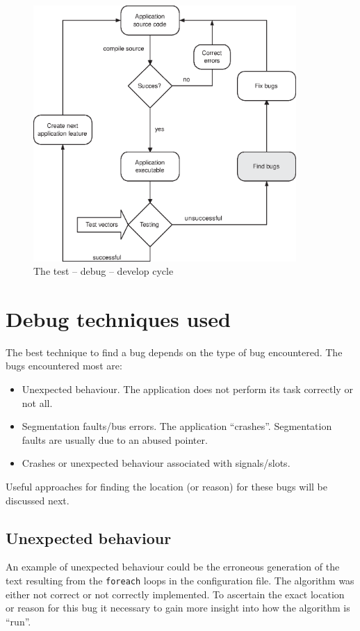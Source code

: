 \begin{figure} \begin{center}
\includegraphics[width=10cm]{./figures/testcycle.eps}
\caption{The test -- debug -- develop cycle}
\label{fig:testing:cycle}
\end{center} \end{figure}

\section{Debug techniques used} \label{chap:testing:techniques}
The best technique to find a bug depends on the type of bug encountered. The
bugs encountered most are:
\begin{itemize}
\item Unexpected behaviour. The application does not perform its task correctly
or not all.
\item Segmentation faults/bus errors. The application ``crashes''. Segmentation faults are usually due to
an abused pointer.
\item Crashes or unexpected behaviour associated with signals/slots.
\end{itemize}
Useful approaches for finding the location (or reason) for these bugs will be
discussed next.

\subsection{Unexpected behaviour}
An example of unexpected behaviour could be the erroneous generation of the
text resulting from the \verb=foreach= loops in the configuration file. The
algorithm was either not correct or not correctly implemented. To ascertain the
exact location or reason for this bug it necessary to gain more insight into
how the algorithm is ``run''.

